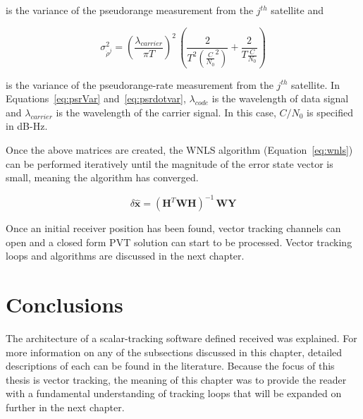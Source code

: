 is the variance of the pseudorange measurement from the \(j^{th}\) satellite and

\begin{equation}\label{eq:psrdotvar}
    \sigma^2_{\dot{\rho}^j} = {\left(\frac{\lambda_{carrier}}{\pi T}\right)}^2\,{\left(\frac{2}{T^2{\left(\frac{C}{N_0}^2\right)}} + \frac{2}{T \frac{C}{N_0}}\right)}
\end{equation}

is the variance of the pseudorange-rate measurement from the \(j^{th}\) satellite. In Equations~\ref{eq:psrVar} and~\ref{eq:psrdotvar}, \(\lambda_{code}\) is the wavelength of data signal and \(\lambda_{carrier}\) is the wavelength of the carrier signal. In this case, \(C/N_0\) is specified in dB-Hz.

Once the above matrices are created, the WNLS algorithm (Equation~\ref{eq:wnls}) can be performed iteratively until the magnitude of the error state vector is small, meaning the algorithm has converged.

\begin{equation}\label{eq:wnls}
    \delta\hat{\mathbf{x}} = {{\left(\mathbf{H}^{T}\mathbf{W}\mathbf{H}\right)}^{-1}\,\mathbf{W}\mathbf{Y}}
\end{equation}

Once an initial receiver position has been found, vector tracking channels can open and a closed form PVT solution can start to be processed. Vector tracking loops and algorithms are discussed in the next chapter.

\section{Conclusions}
The architecture of a scalar-tracking software defined received was explained. For more information on any of the subsections discussed in this chapter, detailed descriptions of each can be found in the literature. Because the focus of this thesis is vector tracking, the meaning of this chapter was to provide the reader with a fundamental understanding of tracking loops that will be expanded on further in the next chapter.